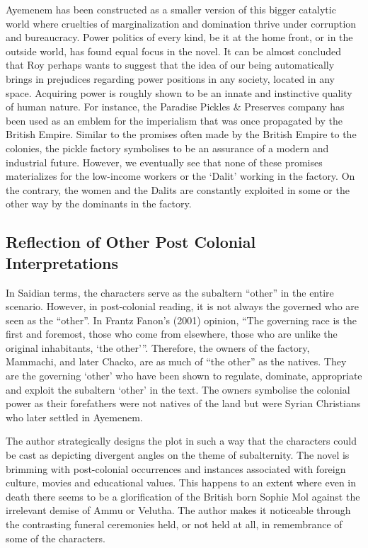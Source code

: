 Ayemenem has been constructed as a smaller version of this bigger catalytic world where cruelties of marginalization and domination thrive under corruption and bureaucracy. Power politics of every kind, be it at the home front, or in the outside world, has found equal focus in the novel. It can be almost concluded that Roy perhaps wants to suggest that the idea of our being automatically brings in prejudices regarding power positions in any society, located in any space. Acquiring power is roughly shown to be an innate and instinctive quality of human nature. For instance, the Paradise Pickles \& Preserves company has been used as an emblem for the imperialism that was once propagated by the British Empire. Similar to the promises often made by the British Empire to the colonies, the pickle factory symbolises to be an assurance of a modern and industrial future. However, we eventually see that none of these promises materializes for the low-income workers or the `Dalit' working in the factory. On the contrary, the women and the Dalits are constantly exploited in some or the other way by the dominants in the factory. 

\subsection{Reflection of Other Post Colonial Interpretations}

In Saidian terms, the characters serve as the subaltern ``other'' in the entire scenario. However, in post-colonial reading, it is not always the governed who are seen as the ``other''. In Frantz Fanon's (2001) opinion, ``The governing race is the first and foremost, those who come from elsewhere, those who are unlike the original inhabitants, `the other'''. Therefore, the owners of the factory, Mammachi, and later Chacko, are as much of ``the other'' as the natives. They are the governing `other' who have been shown to regulate, dominate, appropriate and exploit the subaltern `other' in the text. The owners symbolise the colonial power as their forefathers were not natives of the land but were Syrian Christians who later settled in Ayemenem.

The author strategically designs the plot in such a way that the characters could be cast as depicting divergent angles on the theme of subalternity. The novel is brimming with post-colonial occurrences and instances associated with foreign culture, movies and educational values. This happens to an extent where even in death there seems to be a glorification of the British born Sophie Mol against the irrelevant demise of Ammu or Velutha. The author makes it noticeable through the contrasting funeral ceremonies held, or not held at all, in remembrance of some of the characters. 

